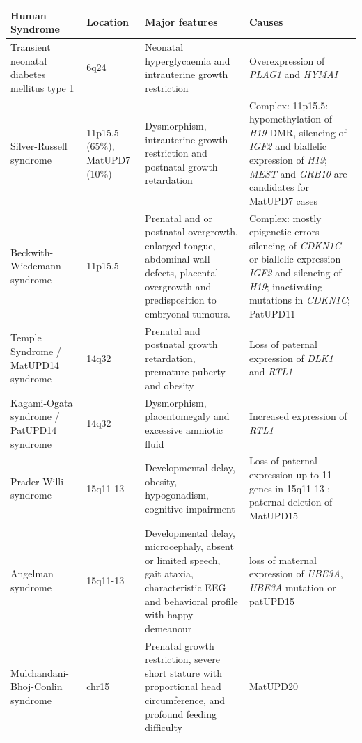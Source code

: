 \begin{table}
\centering
\begin{adjustbox}{width=1\textwidth}
\begin{tabular}{@{}p{3cm}p{2cm}p{7cm}p{7cm}@{}}
\toprule Human Syndrome & Location & Major features & Causes \\ \midrule 
Transient neonatal diabetes mellitus type 1\cite{Mackay:2006bv} & 6q24& Neonatal hyperglycaemia and intrauterine growth restriction & Overexpression of \emph{PLAG1} and \emph{HYMAI}\\
Silver-Russell syndrome\cite{Eggermann:2010gl,Wakeling:2017kv} & 11p15.5 (65\%), MatUPD7  (10\%) & Dysmorphism, intrauterine growth restriction and postnatal growth retardation & Complex: 11p15.5: hypomethylation of \emph{H19} DMR, silencing of \emph{IGF2} and biallelic expression of \emph{H19}; \emph{MEST} and \emph{GRB10} are candidates for MatUPD7 cases\\
Beckwith-Wiedemann syndrome\cite{Choufani:2010ca} & 11p15.5 & Prenatal and or postnatal overgrowth, enlarged tongue, abdominal wall defects, placental overgrowth and predisposition to embryonal tumours. & Complex: mostly epigenetic errors- silencing of \emph{CDKN1C} or biallelic expression \emph{IGF2} and silencing of \emph{H19}; inactivating mutations in \emph{CDKN1C}; PatUPD11\\
Temple Syndrome\cite{Ioannides:2014ka,Kagami:2017gp} / MatUPD14 syndrome & 14q32 & Prenatal and postnatal growth retardation, premature puberty and obesity & Loss of paternal expression of \emph{DLK1} and \emph{RTL1} \\
Kagami-Ogata syndrome\cite{Kagami:2015gn,Kagami:2017gp,Ogata:2016jb} / PatUPD14 syndrome & 14q32 & Dysmorphism, placentomegaly and excessive amniotic fluid & Increased expression of \emph{RTL1}\\
Prader-Willi syndrome\cite{Buiting:2010ci} & 15q11-13 & Developmental delay, obesity, hypogonadism, cognitive impairment & Loss of paternal expression up to 11 genes in 15q11-13 : paternal deletion of MatUPD15\\  
Angelman syndrome\cite{Buiting:2010ci}  & 15q11-13 & Developmental delay, microcephaly, absent or limited speech, gait ataxia, characteristic EEG and behavioral profile with happy demeanour & loss of maternal expression of \emph{UBE3A}, \emph{UBE3A} mutation or patUPD15\\
Mulchandani-Bhoj-Conlin syndrome\cite{Mulchandani:2016kf} & chr15 & Prenatal growth restriction, severe short stature with proportional head circumference, and profound feeding difficulty & MatUPD20\\

\end{tabular}
\end{adjustbox}
\end{table}
